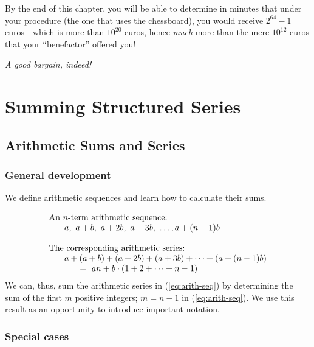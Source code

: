 By the end of this chapter, you will be able to determine in minutes
that under your procedure (the one that uses the chessboard), you
would receive $2^{64} -1$ euros---which is more than $10^{20}$ euros,
hence {\em much} more than the mere $10^{12}$ euros that your
``benefactor'' offered you!

\noindent
{\em A good bargain, indeed!}



\section{Summing Structured Series}
\label{sec:structured-series}

\subsection{Arithmetic Sums and Series}
\label{sec:arithmetic-series}

\subsubsection{General development}

We define arithmetic sequences and learn how to calculate their sums.

\begin{equation}
\label{eq:arith-seq}
\begin{array}{l}
\mbox{An $n$-term arithmetic sequence:} \\
\hspace*{.25in}a, \ a+b, \ a+2b, \ a+3b, \ \ldots, a+(n-1)b \\
\\
\mbox{The corresponding arithmetic series:} \\
\hspace*{.25in}a + (a+b) + (a+2b) + (a+3b) + \cdots + (a+(n-1)b) \\
\hspace*{.5in} = \
an + b \cdot (1 + 2 + \cdots + n-1)
\end{array}
\end{equation}
We can, thus, sum the arithmetic series in (\ref{eq:arith-seq}) by
determining the sum of the first $m$ positive integers; $m = n-1$ in
(\ref{eq:arith-seq}).  We use this result as an opportunity to
introduce important notation.

\subsubsection{Special cases}
\label{sec:special-arithmetic sums}

